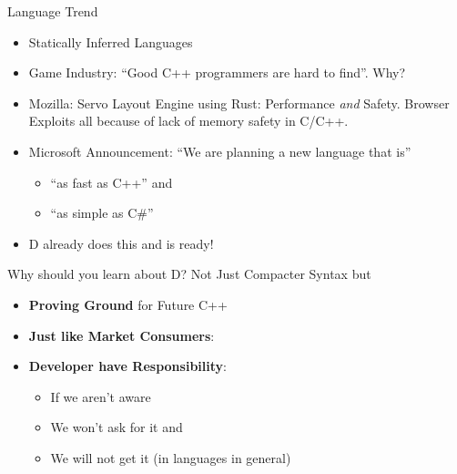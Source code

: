 \documentclass[xcolor=dvipsnames]{beamer}
\begin{document}
\begin{frame}[fragile]{Language Trend}
  \begin{itemize}[<+->]
  \item Statically Inferred Languages
  \item Game Industry: ``Good C++ programmers are hard to find''. Why?
  \item Mozilla: Servo Layout Engine using Rust: Performance \emph{and}
    Safety. Browser Exploits all because of lack of memory safety in C/C++.
  \item Microsoft Announcement: ``We are planning a new language that is''
    \begin{itemize}[<+->]
    \item ``as fast as C++'' and
    \item ``as simple as C\#''
    \end{itemize}
  \item D already does this and is ready!
  \end{itemize}
\end{frame}

\begin{frame}[fragile]{Why should you learn about D?}
  Not Just Compacter Syntax but
  \begin{itemize}[<+->]
  \item \textbf{Proving Ground} for Future C++
  \item \textbf{Just like Market Consumers}:
  \item \textbf{Developer have Responsibility}:
    \begin{itemize}[<+->]
    \item If we aren't aware
    \item We won't ask for it and
    \item We will not get it (in languages in general)
    \end{itemize}
  \end{itemize}
\end{frame}
\end{document}
